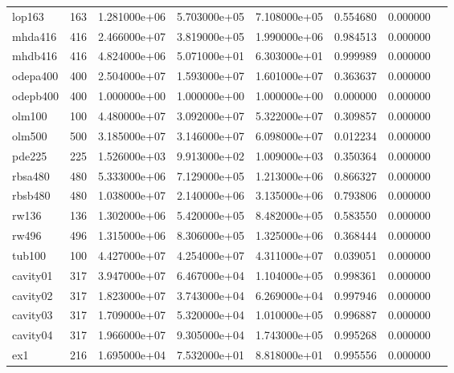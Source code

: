 \begin{tabular}{llrrrrrr}
lop163                  &  163 &  1.281000e+06 &  5.703000e+05 &  7.108000e+05 &  0.554680 &  0.000000 \\
mhda416                 &  416 &  2.466000e+07 &  3.819000e+05 &  1.990000e+06 &  0.984513 &  0.000000 \\
mhdb416                 &  416 &  4.824000e+06 &  5.071000e+01 &  6.303000e+01 &  0.999989 &  0.000000 \\
odepa400                &  400 &  2.504000e+07 &  1.593000e+07 &  1.601000e+07 &  0.363637 &  0.000000 \\
odepb400                &  400 &  1.000000e+00 &  1.000000e+00 &  1.000000e+00 &  0.000000 &  0.000000 \\
olm100                  &  100 &  4.480000e+07 &  3.092000e+07 &  5.322000e+07 &  0.309857 &  0.000000 \\
olm500                  &  500 &  3.185000e+07 &  3.146000e+07 &  6.098000e+07 &  0.012234 &  0.000000 \\
pde225                  &  225 &  1.526000e+03 &  9.913000e+02 &  1.009000e+03 &  0.350364 &  0.000000 \\
rbsa480                 &  480 &  5.333000e+06 &  7.129000e+05 &  1.213000e+06 &  0.866327 &  0.000000 \\
rbsb480                 &  480 &  1.038000e+07 &  2.140000e+06 &  3.135000e+06 &  0.793806 &  0.000000 \\
rw136                   &  136 &  1.302000e+06 &  5.420000e+05 &  8.482000e+05 &  0.583550 &  0.000000 \\
rw496                   &  496 &  1.315000e+06 &  8.306000e+05 &  1.325000e+06 &  0.368444 &  0.000000 \\
tub100                  &  100 &  4.427000e+07 &  4.254000e+07 &  4.311000e+07 &  0.039051 &  0.000000 \\
cavity01                &  317 &  3.947000e+07 &  6.467000e+04 &  1.104000e+05 &  0.998361 &  0.000000 \\
cavity02                &  317 &  1.823000e+07 &  3.743000e+04 &  6.269000e+04 &  0.997946 &  0.000000 \\
cavity03                &  317 &  1.709000e+07 &  5.320000e+04 &  1.010000e+05 &  0.996887 &  0.000000 \\
cavity04                &  317 &  1.966000e+07 &  9.305000e+04 &  1.743000e+05 &  0.995268 &  0.000000 \\
ex1                     &  216 &  1.695000e+04 &  7.532000e+01 &  8.818000e+01 &  0.995556 &  0.000000 \\

\end{tabular}
